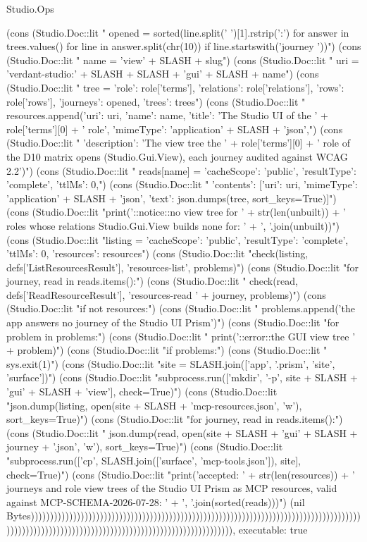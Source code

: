 \begin{lexlean}{Studio.Ops}
\begin{semanticmodule}
{{    (cons (Studio.Doc::lit "    opened = sorted({line.split(' ')[1].rstrip(':') for answer in trees.values() for line in answer.split(chr(10)) if line.startswith('journey ')})\n")
    (cons (Studio.Doc::lit "    name = 'view' + SLASH + slug\n")
    (cons (Studio.Doc::lit "    uri = 'verdant-studio:' + SLASH + SLASH + 'gui' + SLASH + name\n")
    (cons (Studio.Doc::lit "    tree = {'role': role['terms'], 'relations': role['relations'], 'rows': role['rows'], 'journeys': opened, 'trees': trees}\n")
    (cons (Studio.Doc::lit "    resources.append({'uri': uri, 'name': name, 'title': 'The Studio UI of the ' + role['terms'][0] + ' role', 'mimeType': 'application' + SLASH + 'json',\n")
    (cons (Studio.Doc::lit "                      'description': 'The view tree the ' + role['terms'][0] + ' role of the D10 matrix opens (Studio.Gui.View), each journey audited against WCAG 2.2'})\n")
    (cons (Studio.Doc::lit "    reads[name] = {'cacheScope': 'public', 'resultType': 'complete', 'ttlMs': 0,\n")
    (cons (Studio.Doc::lit "                   'contents': [{'uri': uri, 'mimeType': 'application' + SLASH + 'json', 'text': json.dumps(tree, sort_keys=True)}]}\n")
    (cons (Studio.Doc::lit "print('::notice::no view tree for ' + str(len(unbuilt)) + ' roles whose relations Studio.Gui.View builds none for: ' + ', '.join(unbuilt))\n")
    (cons (Studio.Doc::lit "listing = {'cacheScope': 'public', 'resultType': 'complete', 'ttlMs': 0, 'resources': resources}\n")
    (cons (Studio.Doc::lit "check(listing, defs['ListResourcesResult'], 'resources-list', problems)\n")
    (cons (Studio.Doc::lit "for journey, read in reads.items():\n")
    (cons (Studio.Doc::lit "    check(read, defs['ReadResourceResult'], 'resources-read ' + journey, problems)\n")
    (cons (Studio.Doc::lit "if not resources:\n")
    (cons (Studio.Doc::lit "    problems.append('the app answers no journey of the Studio UI Prism')\n")
    (cons (Studio.Doc::lit "for problem in problems:\n")
    (cons (Studio.Doc::lit "    print('::error::the GUI view tree ' + problem)\n")
    (cons (Studio.Doc::lit "if problems:\n")
    (cons (Studio.Doc::lit "    sys.exit(1)\n")
    (cons (Studio.Doc::lit "site = SLASH.join(['app', '.prism', 'site', 'surface'])\n")
    (cons (Studio.Doc::lit "subprocess.run(['mkdir', '-p', site + SLASH + 'gui' + SLASH + 'view'], check=True)\n")
    (cons (Studio.Doc::lit "json.dump(listing, open(site + SLASH + 'mcp-resources.json', 'w'), sort_keys=True)\n")
    (cons (Studio.Doc::lit "for journey, read in reads.items():\n")
    (cons (Studio.Doc::lit "    json.dump(read, open(site + SLASH + 'gui' + SLASH + journey + '.json', 'w'), sort_keys=True)\n")
    (cons (Studio.Doc::lit "subprocess.run(['cp', SLASH.join(['surface', 'mcp-tools.json']), site], check=True)\n")
    (cons (Studio.Doc::lit "print('accepted: ' + str(len(resources)) + ' journeys and role view trees of the Studio UI Prism as MCP resources, valid against MCP-SCHEMA-2026-07-28: ' + ', '.join(sorted(reads)))\n")
    (nil Bytes))))))))))))))))))))))))))))))))))))))))))))))))))))))))))))))))))))))))))))))))))))))))))))))))))))))))))))))))))))))))))))))))))))))))))))))))),
  executable: true
}

}
\end{semanticmodule}
\end{lexlean}
